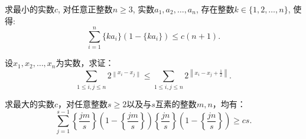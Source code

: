 \documentclass[lang=cn,12pt,thmcnt=section]{elegantbook}
\begin{document}
\exercisetitle

\begin{exercise}
求最小的实数$c$, 对任意正整数$n\ge 3$, 实数$a_1,a_2,\dots{},a_n$, 存在整数$k\in\{1,2,\dots{},n\}$, 使得:
\[
\sum_{i=1}^n \{ka_i\}(1-\{ka_i\})\le c(n+1). 
\]
\end{exercise}

\begin{exercise}
设$x_1,x_2,\dots{},x_n$为实数，求证：
\[
\sum_{1\le i,j\le n}2^{\left\lVert x_i-x_j\right\rVert}\le \sum_{1\le i,j\le n}2^{\left\lVert x_i-x_j+\frac{1}{2}\right\rVert}.
\]
\end{exercise}

\begin{exercise}
求最大的实数$c$，对任意整数$s\ge 2$以及与$s$互素的整数$m,n$，均有：
\[
\sum_{j=1}^{s-1}\left\{\frac{jm}{s}\right\}\left(1-\left\{\frac{jm}{s}\right\}\right)\left\{\frac{jn}{s}\right\}\left(1-\left\{\frac{jn}{s}\right\}\right)\ge cs.
\]
\end{exercise}
\end{document}
